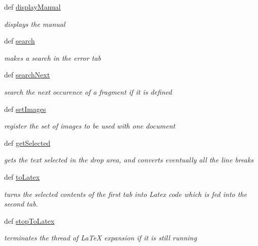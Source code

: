 \begin{DoxyCompactItemize}
def \hyperlink{classuicilibris_1_1w2mMainWindow_a9e24390ca18a0b41afa56c6b24f7d06b}{display\-Manual}
\begin{DoxyCompactList}\small\item\em displays the manual \end{DoxyCompactList}\item 
def \hyperlink{classuicilibris_1_1w2mMainWindow_a0e9674456559e4ae92ade2c99cf93d7b}{search}
\begin{DoxyCompactList}\small\item\em makes a search in the error tab \end{DoxyCompactList}\item 
def \hyperlink{classuicilibris_1_1w2mMainWindow_a588c437ad13c0313a23eda4d4fbe6334}{search\-Next}
\begin{DoxyCompactList}\small\item\em search the next occurence of a fragment if it is defined \end{DoxyCompactList}\item 
def \hyperlink{classuicilibris_1_1w2mMainWindow_a1a1b41e898d650d99ee9de7c0f423ac8}{set\-Images}
\begin{DoxyCompactList}\small\item\em register the set of images to be used with one document \end{DoxyCompactList}\item 
def \hyperlink{classuicilibris_1_1w2mMainWindow_a44b374bc853c2903372e4a0d421929a3}{get\-Selected}
\begin{DoxyCompactList}\small\item\em gets the text selected in the drop area, and converts eventually all the line breaks \end{DoxyCompactList}\item 
def \hyperlink{classuicilibris_1_1w2mMainWindow_a2572ed1ecb17d7984699be7fd2b4c16f}{to\-Latex}
\begin{DoxyCompactList}\small\item\em turns the selected contents of the first tab into \-Latex code which is fed into the second tab. \end{DoxyCompactList}\item 
def \hyperlink{classuicilibris_1_1w2mMainWindow_afcd6b1cbd2e3c7c49c3eb218e63d74fb}{stop\-To\-Latex}
\begin{DoxyCompactList}\small\item\em terminates the thread of \-La\-Te\-X expansion if it is still running \end{DoxyCompactList}\item 

\end{DoxyCompactItemize}
